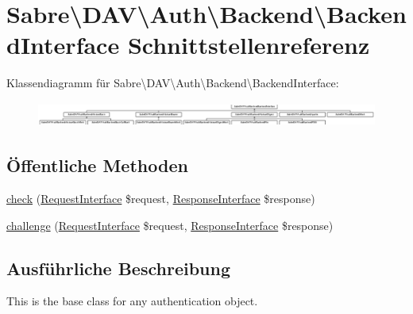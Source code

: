 \hypertarget{interface_sabre_1_1_d_a_v_1_1_auth_1_1_backend_1_1_backend_interface}{}\section{Sabre\textbackslash{}D\+AV\textbackslash{}Auth\textbackslash{}Backend\textbackslash{}Backend\+Interface Schnittstellenreferenz}
\label{interface_sabre_1_1_d_a_v_1_1_auth_1_1_backend_1_1_backend_interface}
Klassendiagramm für Sabre\textbackslash{}D\+AV\textbackslash{}Auth\textbackslash{}Backend\textbackslash{}Backend\+Interface\+:\begin{figure}[H]
\begin{center}
\leavevmode
\includegraphics[height=0.830450cm]{interface_sabre_1_1_d_a_v_1_1_auth_1_1_backend_1_1_backend_interface}
\end{center}
\end{figure}
\subsection*{Öffentliche Methoden}
\begin{DoxyCompactItemize}
\item 
\mbox{\hyperlink{interface_sabre_1_1_d_a_v_1_1_auth_1_1_backend_1_1_backend_interface_a404029177c1ed79456ad9283ec76d50a}{check}} (\mbox{\hyperlink{interface_sabre_1_1_h_t_t_p_1_1_request_interface}{Request\+Interface}} \$request, \mbox{\hyperlink{interface_sabre_1_1_h_t_t_p_1_1_response_interface}{Response\+Interface}} \$response)
\item 
\mbox{\hyperlink{interface_sabre_1_1_d_a_v_1_1_auth_1_1_backend_1_1_backend_interface_a486025eeb4b3b342e7bea4e692a83d94}{challenge}} (\mbox{\hyperlink{interface_sabre_1_1_h_t_t_p_1_1_request_interface}{Request\+Interface}} \$request, \mbox{\hyperlink{interface_sabre_1_1_h_t_t_p_1_1_response_interface}{Response\+Interface}} \$response)
\end{DoxyCompactItemize}


\subsection{Ausführliche Beschreibung}
This is the base class for any authentication object.

